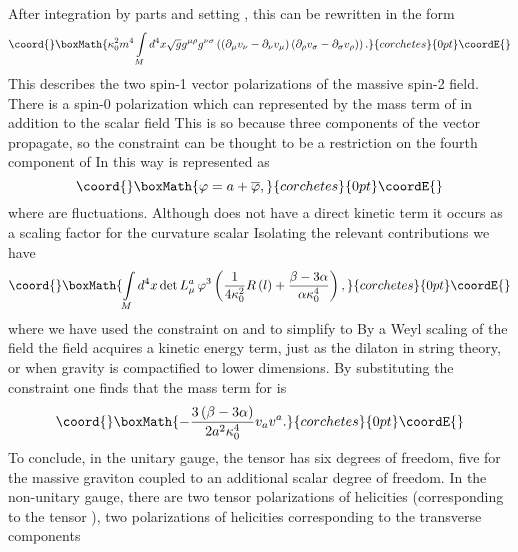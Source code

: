\documentclass[a4paper,12pt]{article}
\begin{document}
After integration by parts and setting \coordHE{}, this can be rewritten in the
form
\[\coord{}\boxMath{
\kappa_{0}^{2}m^{4}\int\limits_{M}d^{4}x\sqrt{g}g^{\mu\rho}g^{\nu\sigma
}\left(  \left(  \partial_{\mu}v_{\nu}-\partial_{\nu}v_{\mu}\right)  \left(
\partial_{\rho}v_{\sigma}-\partial_{\sigma}v_{\rho}\right)  \right)  .
}{corchetes}{0pt}\coordE{}\]
This describes the two spin-1 vector polarizations of the massive spin-2
field. There is a  spin-0 polarization which can represented by the mass term
of \coordHE{} in addition to  the scalar field \coordHE{} This  is so because
three components of the vector \coordHE{} propagate, so the constraint can be
thought to be a restriction on the fourth component of \coordHE{} In this way
\myHighlight{$\varphi$}\coordHE{} is represented as
\[\coord{}\boxMath{
\varphi=a+\overline{\varphi},
}{corchetes}{0pt}\coordE{}\]
where \myHighlight{$\overline{\varphi}$}\coordHE{} are fluctuations. Although \myHighlight{$\varphi$}\coordHE{} does not have
a direct kinetic term it occurs as a scaling factor for the curvature scalar
\coordHE{} Isolating the relevant contributions we have%
\[\coord{}\boxMath{
\int\limits_{M}d^{4}x\det L_{\mu}^{a}\,\varphi^{3}\left(  \frac{1}{4\kappa
_{0}^{2}}R\left(  l\right)  +\frac{\beta-3\alpha}{\alpha\kappa_{0}^{4}%
}\right)  ,
}{corchetes}{0pt}\coordE{}\]
where we have used the constraint on \myHighlight{$\varphi$}\coordHE{} and \coordHE{} to simplify
\coordHE{} to \coordHE{} By a Weyl scaling of the field \coordHE{} the field
\myHighlight{$\varphi$}\coordHE{} acquires a kinetic energy term, just as the dilaton in string
theory, or when gravity is compactified to lower dimensions. By substituting
the constraint one finds that the mass term for \coordHE{} is
\[\coord{}\boxMath{
-\frac{3\left(  \beta-3\alpha\right)  }{2a^{2}\kappa_{0}^{4}}v_{a}v^{a}.
}{corchetes}{0pt}\coordE{}\]
To conclude, in the unitary gauge, the tensor \coordHE{} has six degrees of
freedom, five for the massive graviton coupled to an additional scalar degree
of freedom. In the non-unitary gauge, there are two tensor polarizations of
helicities \coordHE{} (corresponding to the tensor \coordHE{}), two
polarizations of helicities \coordHE{} corresponding to the transverse components
\end{document}
